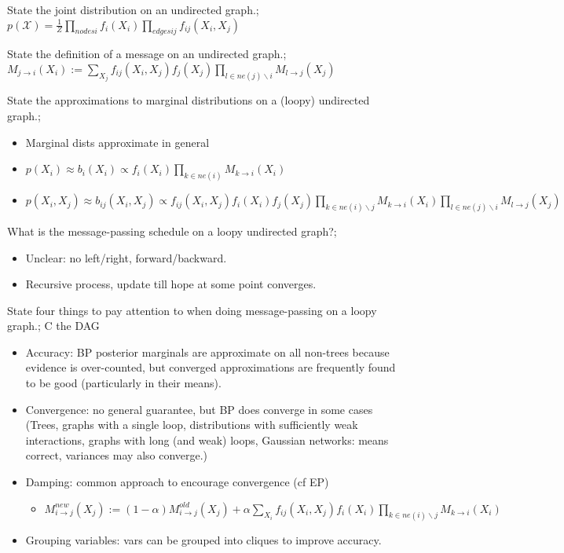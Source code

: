 \documentclass{article}
\begin{document}
State the joint distribution on an undirected graph.; $p(\mathcal{X}) = \frac{1}{Z}\prod_{nodes i}f_i(X_i)\prod_{edges ij}f_{ij}(X_i, X_j)$

State the definition of a message on an undirected graph.; $M_{j\rightarrow i}(X_i) := \sum_{X_j}f_{ij}(X_i, X_j)f_j(X_j)\prod_{l\in ne(j) \backslash i}M_{l\rightarrow j}(X_j)$

State the approximations to marginal distributions on a (loopy) undirected graph.; \begin{itemize} \item Marginal dists approximate in general \item $p(X_i)\approx b_i(X_i) \propto f_i(X_i)\prod_{k\in ne(i) }M_{k\rightarrow i}(X_i)$ \item $p(X_i, X_j) \approx b_{ij}(X_i, X_j) \propto f_{ij}(X_i, X_j)f_i(X_i)f_j(X_j)\prod_{k\in ne(i)\backslash j}M_{k\rightarrow i}(X_i)\prod_{l\in ne(j)\backslash i}M_{l\rightarrow j}(X_j)$ \end{itemize} 

What is the message-passing schedule on a loopy undirected graph?; \begin{itemize} \item Unclear: no left/right, forward/backward. \item Recursive process, update till hope at some point converges. \end{itemize}

State four things to pay attention to when doing message-passing on a loopy graph.; C the DAG \begin{itemize} \item Accuracy: BP posterior marginals are approximate on all non-trees because evidence is over-counted, but converged approximations are frequently found to be good (particularly in their means). \item Convergence: no general guarantee, but BP does converge in some cases (Trees, graphs with a single loop, distributions with sufficiently weak interactions, graphs with long (and weak) loops, Gaussian networks: means correct, variances may also converge.) \item Damping: common approach to encourage convergence (cf EP) \begin{itemize} \item $M^{new}_{i\rightarrow j}(X_j):= (1-\alpha)M^{old}_{i\rightarrow j}(X_j) + \alpha\sum_{X_i}f_{ij}(X_i, X_j)f_i(X_i)\prod_{k\in ne(i)\backslash j}M_{k\rightarrow i}(X_i)$ \end{itemize} \item Grouping variables: vars can be grouped into cliques to improve accuracy. \end{itemize}
\end{document}

